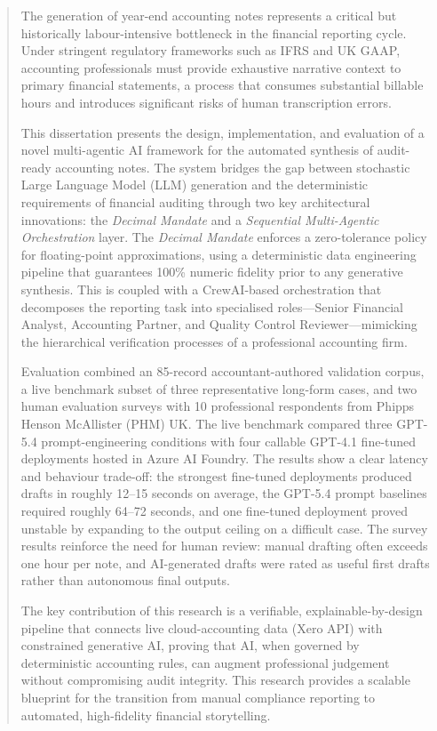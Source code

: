 \begin{abstract}
The generation of year-end accounting notes represents a critical but historically labour-intensive bottleneck in the financial reporting cycle. Under stringent regulatory frameworks such as IFRS and UK GAAP, accounting professionals must provide exhaustive narrative context to primary financial statements, a process that consumes substantial billable hours and introduces significant risks of human transcription errors. 

This dissertation presents the design, implementation, and evaluation of a novel multi-agentic AI framework for the automated synthesis of audit-ready accounting notes. The system bridges the gap between stochastic Large Language Model (LLM) generation and the deterministic requirements of financial auditing through two key architectural innovations: the \textit{Decimal Mandate} and a \textit{Sequential Multi-Agentic Orchestration} layer. The \textit{Decimal Mandate} enforces a zero-tolerance policy for floating-point approximations, using a deterministic data engineering pipeline that guarantees 100\% numeric fidelity prior to any generative synthesis. This is coupled with a CrewAI-based orchestration that decomposes the reporting task into specialised roles—Senior Financial Analyst, Accounting Partner, and Quality Control Reviewer—mimicking the hierarchical verification processes of a professional accounting firm.

Evaluation combined an 85-record accountant-authored validation corpus, a live benchmark subset of three representative long-form cases, and two human evaluation surveys with 10 professional respondents from Phipps Henson McAllister (PHM) UK. The live benchmark compared three GPT-5.4 prompt-engineering conditions with four callable GPT-4.1 fine-tuned deployments hosted in Azure AI Foundry. The results show a clear latency and behaviour trade-off: the strongest fine-tuned deployments produced drafts in roughly 12--15 seconds on average, the GPT-5.4 prompt baselines required roughly 64--72 seconds, and one fine-tuned deployment proved unstable by expanding to the output ceiling on a difficult case. The survey results reinforce the need for human review: manual drafting often exceeds one hour per note, and AI-generated drafts were rated as useful first drafts rather than autonomous final outputs.

The key contribution of this research is a verifiable, explainable-by-design pipeline that connects live cloud-accounting data (Xero API) with constrained generative AI, proving that AI, when governed by deterministic accounting rules, can augment professional judgement without compromising audit integrity. This research provides a scalable blueprint for the transition from manual compliance reporting to automated, high-fidelity financial storytelling.
\end{abstract}
